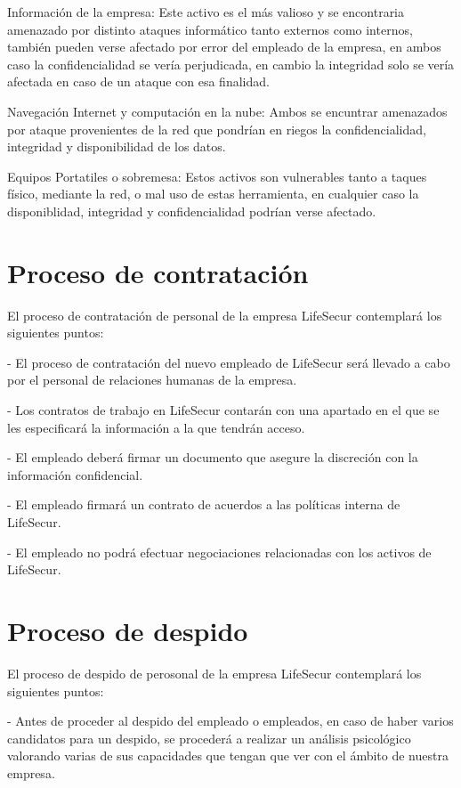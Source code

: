 \documentclass[11pt,bibtotoc,noliststotoc,BCOR0mm]{scrbook}
\begin{document}
Información de la empresa: Este activo es el más valioso y se encontraria amenazado por distinto ataques informático tanto externos como internos, también pueden verse afectado por error del empleado de la empresa, en ambos caso la confidencialidad se vería perjudicada, en cambio la integridad solo se vería afectada en caso de un ataque con esa finalidad.

Navegación Internet y computación en la nube: Ambos se encuntrar amenazados por ataque provenientes de la red que pondrían en riegos la confidencialidad, integridad y disponibilidad de los datos.

Equipos Portatiles o sobremesa: Estos activos son vulnerables tanto a taques físico, mediante la red, o mal uso de estas herramienta, en cualquier caso la disponiblidad, integridad y confidencialidad podrían verse afectado.


\section{Proceso de contratación}

El proceso de contratación de personal de la empresa LifeSecur contemplará los siguientes puntos:

- El proceso de contratación del nuevo empleado de LifeSecur será llevado a cabo por el personal de relaciones humanas de la empresa.

- Los contratos de trabajo en LifeSecur contarán con una apartado en el que se les especificará la información a la que tendrán acceso.

- El empleado deberá firmar un documento que asegure la discreción con la información confidencial.

- El empleado firmará un contrato de acuerdos a las políticas interna de LifeSecur.

- El empleado no podrá efectuar negociaciones relacionadas con los activos de LifeSecur.


\section{Proceso de despido}

El proceso de despido de perosonal de la empresa LifeSecur contemplará los siguientes puntos:

- Antes de proceder al despido del empleado o empleados, en caso de haber varios candidatos para un despido, se procederá a realizar un análisis psicológico valorando varias de sus capacidades que tengan que ver con el ámbito de nuestra empresa.
\end{document}
